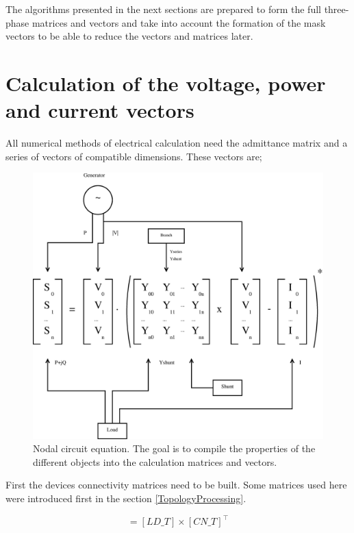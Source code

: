 \documentclass[nols,a4paper,twoside,notoc,fleqn]{tufte-book}
\begin{document}
The algorithms presented in the next sections are prepared to form the full three-phase matrices and vectors and take into account the formation of the mask vectors to be able to reduce the vectors and matrices later.

\section{Calculation of the voltage, power and current vectors}

All numerical methods of electrical calculation need the admittance matrix and a series of vectors of compatible dimensions. These vectors are;

\begin{figure}[h!]
	\centering
	\includegraphics[width=0.9\linewidth]{img/CircuitEquation.eps}
	\caption{Nodal circuit equation. The goal is to compile the properties of the different objects into the calculation matrices and vectors.}
	\label{fig:CircuitEquation}
\end{figure}

First the devices connectivity matrices need to be built. Some matrices used here were introduced first in the section \ref{TopologyProcessing}.

\begin{equation}
[LD\_CN] = [LD\_T] \times [CN\_T]^\top
\end{equation}
\end{document}
